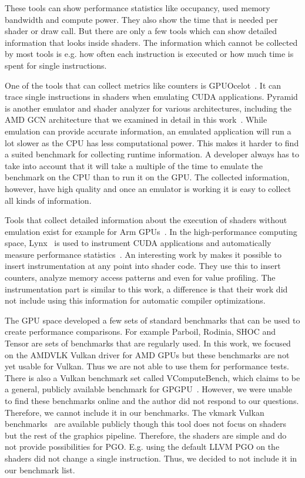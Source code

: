 These tools can show performance statistics like occupancy, used memory bandwidth and compute power.
They also show the time that is needed per shader or draw call.
But there are only a few tools which can show detailed information that looks inside shaders.
The information which cannot be collected by most tools is e.g. how often each instruction is executed or how much time is spent for single instructions.

One of the tools that can collect metrics like counters is GPUOcelot~\cite{GPUOcelot, Lakshminarayana2010}.
It can trace single instructions in shaders when emulating CUDA applications.
Pyramid is another emulator and shader analyzer for various architectures, including the AMD GCN architecture that we examined in detail in this work~\cite{Pyramid}.
While emulation can provide accurate information, an emulated application will run a lot slower as the CPU has less computational power.
This makes it harder to find a suited benchmark for collecting runtime information.
A developer always has to take into account that it will take a multiple of the time to emulate the benchmark on the CPU than to run it on the GPU.
The collected information, however, have high quality and once an emulator is working it is easy to collect all kinds of information.

Tools that collect detailed information about the execution of shaders without emulation exist for example for Arm GPUs~\cite{Barton2013}.
In the high-performance computing space, Lynx~\cite{Lynx} is used to instrument CUDA applications and automatically measure performance statistics~\cite{Farooqui2014}.
An interesting work by \citet{Stephenson2015} makes it possible to insert instrumentation at any point into shader code.
They use this to insert counters, analyze memory access patterns and even for value profiling.
The instrumentation part is similar to this work, a difference is that their work did not include using this information for automatic compiler optimizations.

The GPU space developed a few sets of standard benchmarks that can be used to create performance comparisons.
For example Parboil, Rodinia, SHOC and Tensor are sets of benchmarks that are regularly used.
In this work, we focused on the AMDVLK Vulkan driver for AMD GPUs but these benchmarks are not yet usable for Vulkan.
Thus we are not able to use them for performance tests.
There is also a Vulkan benchmark set called VComputeBench, which claims to be a general, publicly available benchmark for GPGPU~\cite{Mammeri2018}.
However, we were unable to find these benchmarks online and the author did not respond to our questions.
Therefore, we cannot include it in our benchmarks.
The vkmark Vulkan benchmarks~\cite{vkmark} are available publicly though this tool does not focus on shaders but the rest of the graphics pipeline.
Therefore, the shaders are simple and do not provide possibilities for PGO.
E.g. using the default LLVM PGO on the shaders did not change a single instruction.
Thus, we decided to not include it in our benchmark list.

